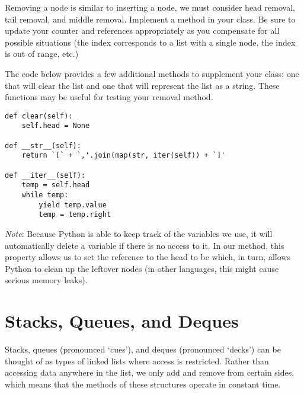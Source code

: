 \begin{problem}
Removing a node is similar to inserting a node, we must consider head removal, tail removal, and middle removal.
Implement a  method in your  class.
Be sure to update your counter and references appropriately as you compensate for all possible situations  (the index corresponds to a list with a single node, the index is out of range, etc.)

The code below provides a few additional methods to supplement your  class: one that will clear the list and one that will represent the list as a string.
These functions may be useful for testing your removal method.
\begin{lstlisting}
def clear(self):
    self.head = None

def __str__(self):
    return `[` + `,'.join(map(str, iter(self)) + `]'
    
def __iter__(self):
    temp = self.head
    while temp:
        yield temp.value
        temp = temp.right
\end{lstlisting}
\emph{Note}: Because Python is able to keep track of the variables we use, it will automatically delete a variable if there is no access to it.
In our  method, this property allows us to set the reference to the head to be  which, in turn, allows Python to clean up the leftover nodes (in other languages, this might cause serious memory leaks).
\label{prob:LinkedList}
\end{problem}

\section*{Stacks, Queues, and Deques}
Stacks, queues (pronounced `cues'), and deques (pronounced `decks') can be thought of as types of linked lists where access is restricted.
Rather than accessing data anywhere in the list, we only add and remove from certain sides, which means that the methods of these structures operate in constant time.

